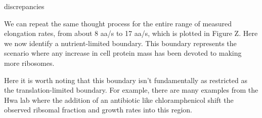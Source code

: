 discrepancies \documentclass[11pt, letterpaper]{article}
\begin{document}
We can repeat the same thought process for the entire range of measured
elongation rates, from about 8 aa/s to 17 aa/s, which is plotted in Figure Z.
Here we now identify a nutrient-limited boundary. This boundary represents the
scenario where any increase in cell protein mass has been devoted to making more
ribosomes.

Here it is worth noting that this boundary isn't fundamentally as restricted as the
translation-limited boundary. For example, there are many examples from the Hwa
lab where the addition of an antibiotic like chloramphenicol shift the observed
ribsomal fraction and growth rates into this region.


%
%
%




\end{document}
